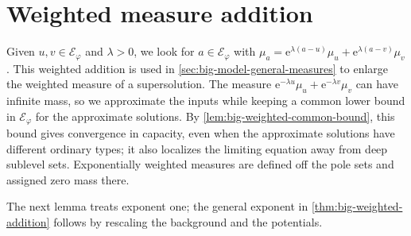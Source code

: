 \section{Weighted measure addition}
\label{sec:big-weighted-limits}

Given $u,v\in\mathcal E_\varphi$ and $\lambda>0$, we look for $a\in\mathcal E_\varphi$ with $\mu_a=\mathrm{e}^{\lambda(a-u)}\mu_u+\mathrm{e}^{\lambda(a-v)}\mu_v$. This weighted addition is used in \cref{sec:big-model-general-measures} to enlarge the weighted measure of a supersolution. The measure $\mathrm{e}^{-\lambda u}\mu_u+\mathrm{e}^{-\lambda v}\mu_v$ can have infinite mass, so we approximate the inputs while keeping a common lower bound in $\mathcal E_\varphi$ for the approximate solutions. By \cref{lem:big-weighted-common-bound}, this bound gives convergence in capacity, even when the approximate solutions have different ordinary types; it also localizes the limiting equation away from deep sublevel sets. Exponentially weighted measures are defined off the pole sets and assigned zero mass there.

The next lemma treats exponent one; the general exponent in \cref{thm:big-weighted-addition} follows by rescaling the background and the potentials.

